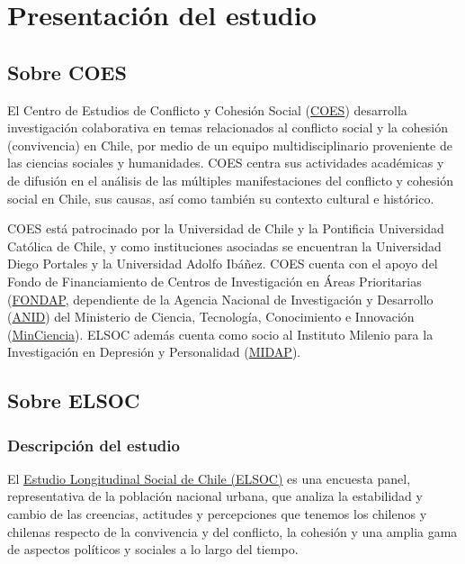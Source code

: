 \documentclass[
  12pt,
]{book}
\begin{document}
\hypertarget{presentaciuxf3n-del-estudio}{%
\chapter{Presentación del estudio}\label{presentaciuxf3n-del-estudio}}

\hypertarget{sobre-coes}{%
\section{Sobre COES}\label{sobre-coes}}

El Centro de Estudios de Conflicto y Cohesión Social (\href{https://coes.cl/}{COES}) desarrolla investigación colaborativa en temas relacionados al conflicto social y la cohesión (convivencia) en Chile, por medio de un equipo multidisciplinario proveniente de las ciencias sociales y humanidades. COES centra sus actividades académicas y de difusión en el análisis de las múltiples manifestaciones del conflicto y cohesión social en Chile, sus causas, así como también su contexto cultural e histórico.

COES está patrocinado por la Universidad de Chile y la Pontificia Universidad Católica de Chile, y como instituciones asociadas se encuentran la Universidad Diego Portales y la Universidad Adolfo Ibáñez. COES cuenta con el apoyo del Fondo de Financiamiento de Centros de Investigación en Áreas Prioritarias (\href{https://www.conicyt.cl/fondap/sobre-fondap/que-es-fondap/}{FONDAP}, dependiente de la Agencia Nacional de Investigación y Desarrollo (\href{https://www.anid.cl/}{ANID}) del Ministerio de Ciencia, Tecnología, Conocimiento e Innovación (\href{https://www.minciencia.gob.cl/}{MinCiencia}). ELSOC además cuenta como socio al Instituto Milenio para la Investigación en Depresión y Personalidad (\href{https://midap.org/}{MIDAP}).

\hypertarget{sobre-elsoc}{%
\section{Sobre ELSOC}\label{sobre-elsoc}}

\hypertarget{descripciuxf3n-del-estudio}{%
\subsection*{Descripción del estudio}\label{descripciuxf3n-del-estudio}}

El \href{https://coes.cl/encuesta-panel/}{Estudio Longitudinal Social de Chile (ELSOC)} es una encuesta panel, representativa de la población nacional urbana, que analiza la estabilidad y cambio de las creencias, actitudes y percepciones que tenemos los chilenos y chilenas respecto de la convivencia y del conflicto, la cohesión y una amplia gama de aspectos políticos y sociales a lo largo del tiempo.
\end{document}
